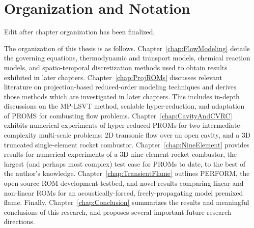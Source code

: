 \section{Organization and Notation}

{\color{red}Edit after chapter organization has been finalized.}

The organization of this thesis is as follows. Chapter~\ref{chap:FlowModeling} details the governing equations, thermodynamic and transport models, chemical reaction models, and spatio-temporal discretization methods used to obtain results exhibited in later chapters. Chapter~\ref{chap:ProjROMs} discusses relevant literature on projection-based reduced-order modeling techniques and derives those methods which are investigated in later chapters. This includes in-depth discussions on the MP-LSVT method, scalable hyper-reduction, and adaptation of PROMS for combusting flow problems. Chapter~\ref{chap:CavityAndCVRC} exhibits numerical experiments of hyper-reduced PROMs for two intermediate-complexity multi-scale problems: 2D transonic flow over an open cavity, and a 3D truncated single-element rocket combustor. Chapter~\ref{chap:NineElement} provides results for numerical experiments of a 3D nine-element rocket combustor, the largest (and perhaps most complex) test case for PROMs to date, to the best of the author's knowledge. Chapter~\ref{chap:TransientFlame} outlines PERFORM, the open-source ROM development testbed, and novel results comparing linear and non-linear ROMs for an acoustically-forced, freely-propagating model premixed flame. Finally, Chapter~\ref{chap:Conclusion} summarizes the results and meaningful conclusions of this research, and proposes several important future research directions.

